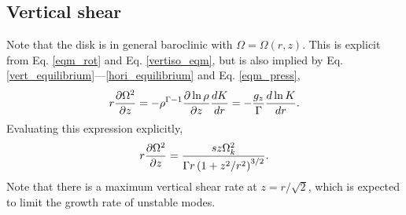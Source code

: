 \subsection{Vertical shear}\label{vshear_def}
Note that the disk is in general baroclinic with $\Omega =
\Omega(r,z)$. This is explicit from Eq. \ref{eqm_rot} and Eq. \ref{vertiso_eqm}, but is also 
implied by Eq. \ref{vert_equilibrium}---\ref{hori_equilibrium} and 
Eq. \ref{eqm_press},  
\begin{align}
  r\frac{\partial\Omega^2}{\partial z} = - \rho^{\Gamma-1}\frac{\partial\ln\rho}{\partial
    z}\frac{dK}{dr} = - \frac{g_z}{\Gamma}\frac{d\ln K}{dr}.\label{vertical_shear}
\end{align}
Evaluating this expression explicitly,
\begin{align}
  r\frac{\partial\Omega^2}{\partial z} = \frac{sz\Omega_k^2}{\Gamma
    r\left(1+z^2/r^2\right)^{3/2}}. \label{vertical_shear_ex} 
\end{align}
Note that there is a maximum vertical shear rate at $z=r/\sqrt{2}$,
which is expected to limit the growth rate of unstable modes.    



